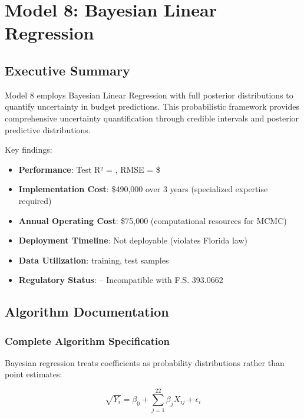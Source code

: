 \chapter{Model 8: Bayesian Linear Regression}\label{ch:model8}



\section{Executive Summary}

Model 8 employs Bayesian Linear Regression with full posterior distributions to quantify uncertainty in budget predictions. This probabilistic framework provides comprehensive uncertainty quantification through credible intervals and posterior predictive distributions.

Key findings:
\begin{itemize}
    \item \textbf{Performance}: Test R² = \ModelEightRSquaredTest{}, RMSE = \$\ModelEightRMSETest{}
    \item \textbf{Implementation Cost}: \$490,000 over 3 years (specialized expertise required)
    \item \textbf{Annual Operating Cost}: \$75,000 (computational resources for MCMC)
    \item \textbf{Deployment Timeline}: Not deployable (violates Florida law)
    \item \textbf{Data Utilization}: \ModelEightTrainingSamples{} training, \ModelEightTestSamples{} test samples
    \item \textbf{Regulatory Status}: \ModelEightRegulatoryCompliant{} -- Incompatible with F.S. 393.0662
\end{itemize}

\section{Algorithm Documentation}

\subsection{Complete Algorithm Specification}

Bayesian regression treats coefficients as probability distributions rather than point estimates:

\begin{equation}
\sqrt{Y_i} = \beta_0 + \sum_{j=1}^{22} \beta_j X_{ij} + \epsilon_i
\end{equation}


